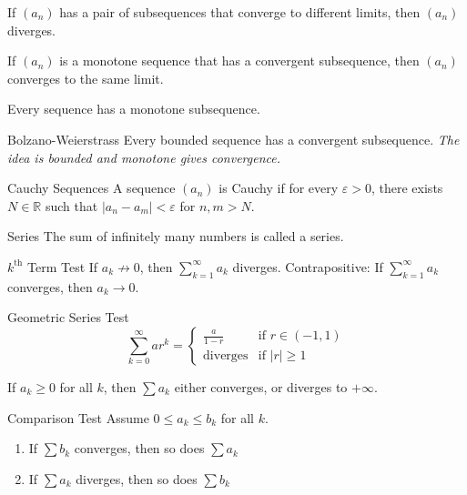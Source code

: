 \documentclass[12pt]{article}
\begin{document}
\begin{corollary}{}{}
    If $ \left( a_n \right) $ has a pair of subsequences that converge to different limits, then $ \left( a_n \right) $ diverges.
\end{corollary}
\begin{proposition}{}{}
    If $ \left( a_n \right) $ is a monotone sequence that has a convergent subsequence, then $ \left( a_n \right) $ converges to the same limit.
\end{proposition}
\begin{lemma}{}{}
    Every sequence has a monotone subsequence.
\end{lemma}
\begin{theorem}{Bolzano-Weierstrass}{}
    Every bounded sequence has a convergent subsequence. \textit{The idea is bounded and monotone gives convergence.}
\end{theorem}
\begin{definition}{Cauchy Sequences}{}
    A sequence $ \left( a_n \right) $ is Cauchy if for every $ \varepsilon > 0 $, there exists $ N \in \mathbb{R} $ such that $ | a_n - a_m | < \varepsilon $ for $ n, m > N $.
\end{definition}
\begin{definition}{Series}{}
    The sum of infinitely many numbers is called a series.
\end{definition}
\begin{proposition}{$ k^\text{th} $ Term Test}{}
    If $ a_k \not \to 0 $, then $ \sum_{k = 1}^\infty a_k $ diverges.
    \medskip
    \newline
    Contrapositive: If $ \sum_{k = 1}^\infty a_k $ converges, then $ a_k \to 0 $.
\end{proposition}
\begin{proposition}{Geometric Series Test}{}
    \[ \sum_{k = 0}^\infty ar^k = \begin{cases}
        \frac{a}{1 - r} & \text{if } r \in \left( -1, 1 \right) \\
        \text{diverges} & \text{if } | r | \geq 1
    \end{cases} \]
\end{proposition}
\begin{proposition}{}{}
    If $ a_k \geq 0 $ for all $ k $, then $ \sum a_k $ either converges, or diverges to $ + \infty $.
\end{proposition}
\begin{proposition}{Comparison Test}{}
    Assume $ 0 \leq a_k \leq b_k $ for all $ k $.
    \begin{enumerate}
        \item If $ \sum b_k $ converges, then so does $ \sum a_k $
        \item If $ \sum a_k $ diverges, then so does $ \sum b_k $
    \end{enumerate}
\end{proposition}
\end{document}
